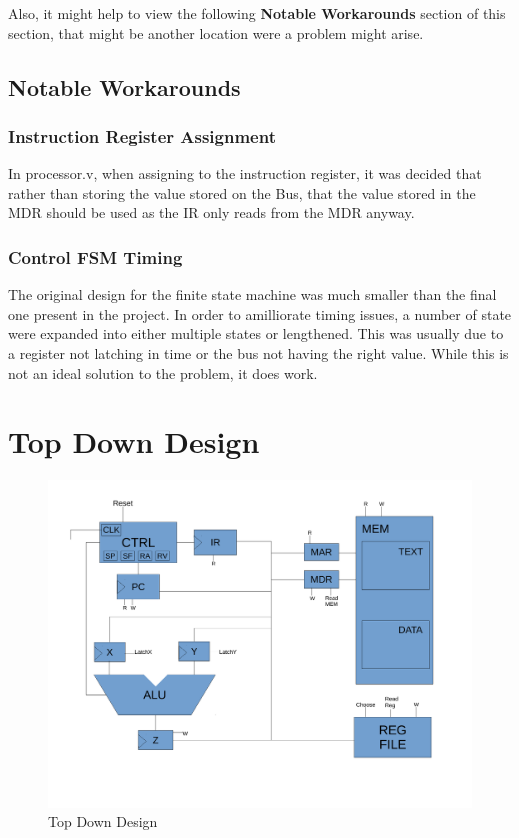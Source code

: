 \documentclass[conference]{IEEEtran}
\begin{document}
Also, it might help to view the following \textbf{Notable Workarounds} section
of this section, that might be another location were a problem might arise.

\subsection{Notable Workarounds}
\subsubsection{Instruction Register Assignment}
In processor.v, when assigning to the instruction register, it was decided 
that rather than storing the value stored on the Bus, that the value stored
in the MDR should be used as the IR only reads from the MDR anyway.
\subsubsection{Control FSM Timing}
The original design for the finite state machine was much smaller than the 
final one present in the project. In order to amilliorate timing issues, a
number of state were expanded into either multiple states or lengthened. This 
was usually due to a register not latching in time or the bus not having the
right value. While this is not an ideal solution to the problem, it does work.


\clearpage 
\section{Top Down Design}
\begin{figure}[!t]
\centering
\includegraphics[width=\textwidth]{TopDownDesignDraftp1.pdf}
\caption{Top Down Design}
\label{fig_sim}
\end{figure}
\end{document}
